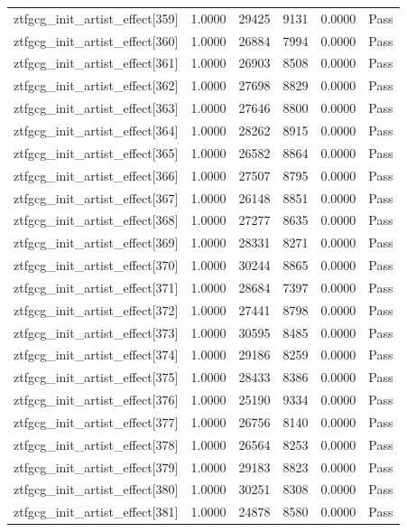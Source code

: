 \begin{table}[htbp]
\begin{tabular}{llrrll}
ztfgcg\_init\_artist\_effect[359] & 1.0000 & 29425 & 9131 & 0.0000 & Pass \\
ztfgcg\_init\_artist\_effect[360] & 1.0000 & 26884 & 7994 & 0.0000 & Pass \\
ztfgcg\_init\_artist\_effect[361] & 1.0000 & 26903 & 8508 & 0.0000 & Pass \\
ztfgcg\_init\_artist\_effect[362] & 1.0000 & 27698 & 8829 & 0.0000 & Pass \\
ztfgcg\_init\_artist\_effect[363] & 1.0000 & 27646 & 8800 & 0.0000 & Pass \\
ztfgcg\_init\_artist\_effect[364] & 1.0000 & 28262 & 8915 & 0.0000 & Pass \\
ztfgcg\_init\_artist\_effect[365] & 1.0000 & 26582 & 8864 & 0.0000 & Pass \\
ztfgcg\_init\_artist\_effect[366] & 1.0000 & 27507 & 8795 & 0.0000 & Pass \\
ztfgcg\_init\_artist\_effect[367] & 1.0000 & 26148 & 8851 & 0.0000 & Pass \\
ztfgcg\_init\_artist\_effect[368] & 1.0000 & 27277 & 8635 & 0.0000 & Pass \\
ztfgcg\_init\_artist\_effect[369] & 1.0000 & 28331 & 8271 & 0.0000 & Pass \\
ztfgcg\_init\_artist\_effect[370] & 1.0000 & 30244 & 8865 & 0.0000 & Pass \\
ztfgcg\_init\_artist\_effect[371] & 1.0000 & 28684 & 7397 & 0.0000 & Pass \\
ztfgcg\_init\_artist\_effect[372] & 1.0000 & 27441 & 8798 & 0.0000 & Pass \\
ztfgcg\_init\_artist\_effect[373] & 1.0000 & 30595 & 8485 & 0.0000 & Pass \\
ztfgcg\_init\_artist\_effect[374] & 1.0000 & 29186 & 8259 & 0.0000 & Pass \\
ztfgcg\_init\_artist\_effect[375] & 1.0000 & 28433 & 8386 & 0.0000 & Pass \\
ztfgcg\_init\_artist\_effect[376] & 1.0000 & 25190 & 9334 & 0.0000 & Pass \\
ztfgcg\_init\_artist\_effect[377] & 1.0000 & 26756 & 8140 & 0.0000 & Pass \\
ztfgcg\_init\_artist\_effect[378] & 1.0000 & 26564 & 8253 & 0.0000 & Pass \\
ztfgcg\_init\_artist\_effect[379] & 1.0000 & 29183 & 8823 & 0.0000 & Pass \\
ztfgcg\_init\_artist\_effect[380] & 1.0000 & 30251 & 8308 & 0.0000 & Pass \\
ztfgcg\_init\_artist\_effect[381] & 1.0000 & 24878 & 8580 & 0.0000 & Pass \\

\end{tabular}
\end{table}

